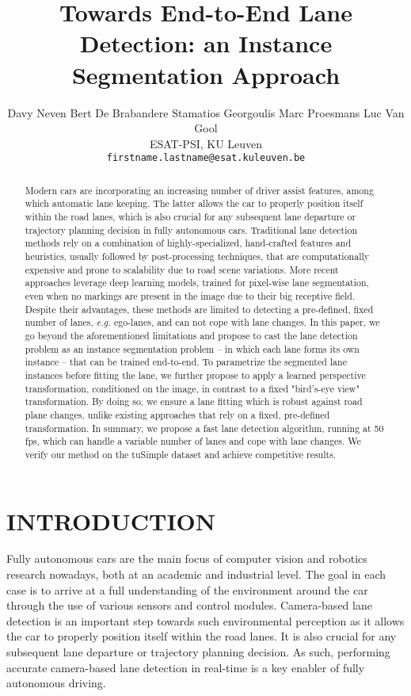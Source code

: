 \documentclass[letterpaper, 10 pt, conference]{ieeeconf}
\title{\LARGE \bf
Towards End-to-End Lane Detection: an Instance Segmentation Approach
}
\author{Davy Neven \qquad Bert De Brabandere \qquad Stamatios Georgoulis \qquad Marc Proesmans \qquad Luc Van Gool\\
ESAT-PSI, KU Leuven\\
{\tt\small firstname.lastname@esat.kuleuven.be}
}
\newcommand{\eg}{\textit{e.g. }}
\begin{document}
\maketitle
\thispagestyle{empty}
\pagestyle{empty}

\begin{abstract}



Modern cars are incorporating an increasing number of driver assist features, among which automatic lane keeping.
The latter allows the car to properly position itself within the road lanes, which is also crucial for any subsequent lane departure or trajectory planning decision in fully autonomous cars.
Traditional lane detection methods rely on a combination of highly-specialized, hand-crafted features and heuristics, usually followed by post-processing techniques, that are computationally expensive and prone to scalability due to road scene variations.
More recent approaches leverage deep learning models, trained for pixel-wise lane segmentation, even when no markings are present in the image due to their big receptive field.
Despite their advantages, these methods are limited to detecting a pre-defined, fixed number of lanes, \eg ego-lanes, and can not cope with lane changes.
In this paper, we go beyond the aforementioned limitations and propose to cast the lane detection problem as an instance segmentation problem -- in which each lane forms its own instance -- that can be trained end-to-end.
To parametrize the segmented lane instances before fitting the lane, we further propose to apply a learned perspective transformation, conditioned on the image, in contrast to a fixed "bird's-eye view" transformation. 
By doing so, we ensure a lane fitting which is robust against road plane changes, unlike existing approaches that rely on a fixed, pre-defined transformation.
In summary, we propose a fast lane detection algorithm, running at 50 fps, which can handle a variable number of lanes and cope with lane changes. 
We verify our method on the tuSimple dataset and achieve competitive results.

\end{abstract}


\section{INTRODUCTION}

Fully autonomous cars are the main focus of computer vision and robotics research nowadays, both at an academic and industrial level.
The goal in each case is to arrive at a full understanding of the environment around the car through the use of various sensors and control modules.
Camera-based lane detection is an important step towards such environmental perception as it allows the car to properly position itself within the road lanes. 
It is also crucial for any subsequent lane departure or trajectory planning decision.
As such, performing accurate camera-based lane detection in real-time is a key enabler of fully autonomous driving. 
\end{document}
